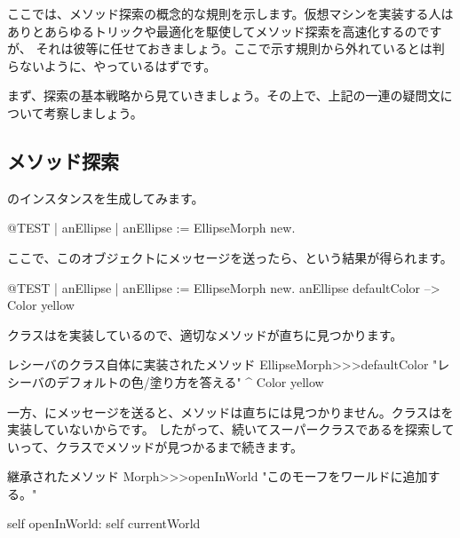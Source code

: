 \documentclass[a4paper,10pt,twoside]{book}
\begin{document}
ここでは、メソッド探索の概念的な規則を示します。仮想マシンを実装する人はありとあらゆるトリックや最適化を駆使してメソッド探索を高速化するのですが、
それは彼等に任せておきましょう。ここで示す規則から外れているとは判らないように、やっているはずです。

まず、探索の基本戦略から見ていきましょう。その上で、上記の一連の疑問文について考察しましょう。

\subsection{メソッド探索}
のインスタンスを生成してみます。
\begin{code}{@TEST | anEllipse |}
anEllipse := EllipseMorph new.
\end{code}
\noindent
ここで、このオブジェクトにメッセージを送ったら、という結果が得られます。
\begin{code}{@TEST | anEllipse | anEllipse := EllipseMorph new.}
anEllipse defaultColor --> Color yellow
\end{code}
\noindent
{}クラスはを実装しているので、適切なメソッドが直ちに見つかります。

\begin{method}[defaultColor]{レシーバのクラス自体に実装されたメソッド}
EllipseMorph>>>defaultColor
	"レシーバのデフォルトの色/塗り方を答える"
	^ Color yellow
\end{method}

一方、にメッセージを送ると、メソッドは直ちには見つかりません。クラスはを実装していないからです。
したがって、続いてスーパークラスであるを探索していって、クラスでメソッドが見つかるまで続きます。

\begin{method}[openInWorld]{継承されたメソッド}
Morph>>>openInWorld
	"このモーフをワールドに追加する。"

	self openInWorld: self currentWorld
\end{method}
\end{document}
